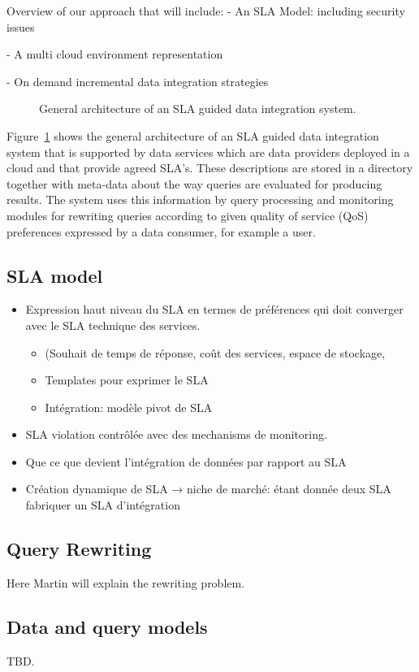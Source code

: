 {\color{green}
Overview of our approach that will include:
- An SLA Model: including security issues

- A multi cloud environment representation

- On demand incremental data integration strategies
}

\begin{figure}
\caption{General architecture of an SLA guided  data integration system.\label{fig:arch}}
\end{figure}

Figure~\ref{fig:arch} shows the general architecture of an SLA guided data integration system that is supported by data services which are data providers deployed in a cloud and that provide agreed SLA’s. 
These descriptions are stored in a directory together with meta-data about the way queries are evaluated for producing results. 
The system uses this information  by query processing and monitoring modules for rewriting queries according to given quality of service (QoS) preferences expressed by a data consumer, for example a user.

\subsection{SLA model}
\label{sec:slaModel}

\begin{itemize}
\item Expression haut niveau du SLA en termes de préférences qui doit converger avec le SLA technique des services.
  \begin{itemize}
  \item (Souhait de temps de réponse, coût des services, espace de stockage,  
  \item Templates pour exprimer le SLA
  \item Intégration: modèle pivot de SLA
\end{itemize}

\item SLA violation contrôlée avec des mechanisms de monitoring.
\item Que ce que devient l’intégration de données par rapport au SLA
\item Création dynamique de SLA → niche de marché: étant donnée deux SLA fabriquer un SLA d’intégration
\end{itemize}


\subsection{Query Rewriting}
\label{sec:queryRew}

{\color{red}
Here Martin will explain the rewriting problem.
}

\subsection{Data and query models}
\label{sec:dqm}

TBD.
